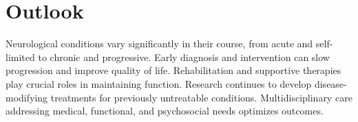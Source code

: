 \section{Outlook}
Neurological conditions vary significantly in their course, from acute and self-limited to chronic and progressive. Early diagnosis and intervention can slow progression and improve quality of life. Rehabilitation and supportive therapies play crucial roles in maintaining function. Research continues to develop disease-modifying treatments for previously untreatable conditions. Multidisciplinary care addressing medical, functional, and psychosocial needs optimizes outcomes.
